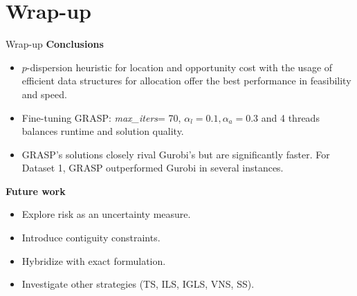 \documentclass{beamer}
\begin{document}
\section{Wrap-up}

\begin{frame}{Wrap-up}
    \small \textbf{Conclusions}
    \scriptsize
    \begin{itemize}
        \item $p$-dispersion heuristic for location and opportunity cost with the usage of efficient data structures for allocation offer the best performance in feasibility and speed.
        \item Fine-tuning GRASP: \textit{max\_iters}= 70, $\alpha_l = 0.1, \alpha_a = 0.3$ and 4 threads balances runtime and solution quality.
        \item GRASP's solutions closely rival Gurobi's but are significantly faster. For Dataset 1, GRASP outperformed Gurobi in several instances.
    \end{itemize}
    \small \textbf{Future work}
    \scriptsize
    \begin{itemize}
        \item Explore risk as an uncertainty measure.
        \item Introduce contiguity constraints.
        \item Hybridize with exact formulation.
        \item Investigate other strategies (TS, ILS, IGLS, VNS, SS).
    \end{itemize}
\end{frame}
\end{document}
